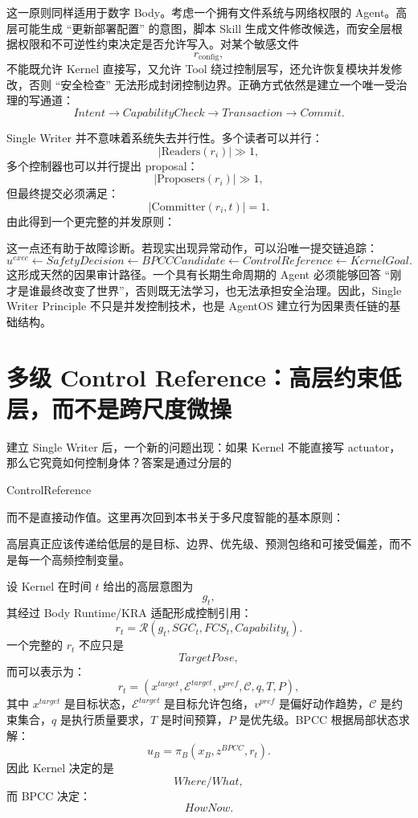 这一原则同样适用于数字 Body。考虑一个拥有文件系统与网络权限的 Agent。高层可能生成 ``更新部署配置'' 的意图，脚本 Skill 生成文件修改候选，而安全层根据权限和不可逆性约束决定是否允许写入。对某个敏感文件
\[
r_{\mathrm{config}},
\]
不能既允许 Kernel 直接写，又允许 Tool 绕过控制层写，还允许恢复模块并发修改，否则 ``安全检查'' 无法形成封闭控制边界。正确方式依然是建立一个唯一受治理的写通道：
\[
Intent
\rightarrow
CapabilityCheck
\rightarrow
Transaction
\rightarrow
Commit.
\]

Single Writer 并不意味着系统失去并行性。多个读者可以并行：
\[
|\mathrm{Readers}(r_i)|\gg1,
\]
多个控制器也可以并行提出 proposal：
\[
|\mathrm{Proposers}(r_i)|\gg1,
\]
但最终提交必须满足：
\[
|\mathrm{Committer}(r_i,t)|=1.
\]
由此得到一个更完整的并发原则：
\begin{statementbox}
\centering
{}
\end{statementbox}

这一点还有助于故障诊断。若现实出现异常动作，可以沿唯一提交链追踪：
\[
u^{exec}
\leftarrow
SafetyDecision
\leftarrow
BPCCCandidate
\leftarrow
ControlReference
\leftarrow
KernelGoal.
\]
这形成天然的因果审计路径。一个具有长期生命周期的 Agent 必须能够回答 ``刚才是谁最终改变了世界''，否则既无法学习，也无法承担安全治理。因此，Single Writer Principle 不只是并发控制技术，也是 AgentOS 建立行为因果责任链的基础结构。

\section{多级 Control Reference：高层约束低层，而不是跨尺度微操}

建立 Single Writer 后，一个新的问题出现：如果 Kernel 不能直接写 actuator，那么它究竟如何控制身体？答案是通过分层的
\begin{statementbox}
ControlReference
\end{statementbox}
而不是直接动作值。这里再次回到本书关于多尺度智能的基本原则：
\begin{statementbox}
\centering
{}
\end{statementbox}
高层真正应该传递给低层的是目标、边界、优先级、预测包络和可接受偏差，而不是每一个高频控制变量。

设 Kernel 在时间 $t$ 给出的高层意图为
\[
g_t,
\]
其经过 Body Runtime/KRA 适配形成控制引用：
\[
r_t
=
\mathcal R(
g_t,
SGC_t,
FCS_t,
Capability_t
).
\]
一个完整的 $r_t$ 不应只是
\[
TargetPose,
\]
而可以表示为：
\[
r_t
=
(
x^{target},
\mathcal E^{target},
v^{pref},
\mathcal C,
q,
T,
P
),
\]
其中 $x^{target}$ 是目标状态，$\mathcal E^{target}$ 是目标允许包络，$v^{pref}$ 是偏好动作趋势，$\mathcal C$ 是约束集合，$q$ 是执行质量要求，$T$ 是时间预算，$P$ 是优先级。BPCC 根据局部状态求解：
\[
u_B
=
\pi_B(
x_B,
z^{BPCC},
r_t
).
\]
因此 Kernel 决定的是
\[
Where/What,
\]
而 BPCC 决定：
\[
HowNow.
\]

